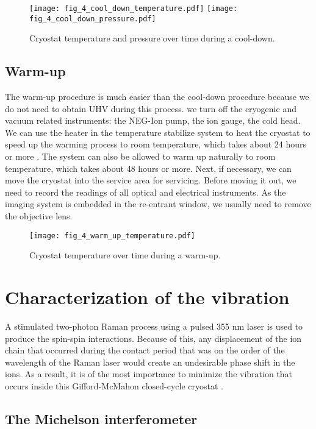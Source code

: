 \begin{figure}
    \centering
    {\texttt{[image: fig\_4\_cool\_down\_temperature.pdf]}}
    {\texttt{[image: fig\_4\_cool\_down\_pressure.pdf]}}
    \caption{Cryostat temperature and pressure over time during a cool-down.}
\end{figure}

\subsection{Warm-up}

The warm-up procedure is much easier than the cool-down procedure because we do not need to obtain UHV during this process. we turn off the cryogenic and vacuum related instruments: the NEG-Ion pump, the ion gauge, the cold head. We can use the heater in the temperature stabilize system to heat the cryostat to speed up the warming process to room temperature, which takes about 24 hours or more \cite{RN357}. The system can also be allowed to warm up naturally to room temperature, which takes about 48 hours or more. Next, if necessary, we can move the cryostat into the service area for servicing. Before moving it out, we need to record the readings of all optical and electrical instruments. As the imaging system is embedded in the re-entrant window, we usually need to remove the objective lens.

\begin{figure}
    \centering
    \texttt{[image: fig\_4\_warm\_up\_temperature.pdf]}
    \caption{Cryostat temperature over time during a warm-up.}
\end{figure}

\section{Characterization of the vibration}

A stimulated two-photon Raman process using a pulsed 355 nm laser is used to produce the spin-spin interactions. Because of this, any displacement of the ion chain that occurred during the contact period that was on the order of the wavelength of the Raman laser would create an undesirable phase shift in the ions. As a result, it is of the most importance to minimize the vibration that occurs inside this Gifford-McMahon closed-cycle cryostat \cite{RN126}.

\subsection{The Michelson interferometer}

